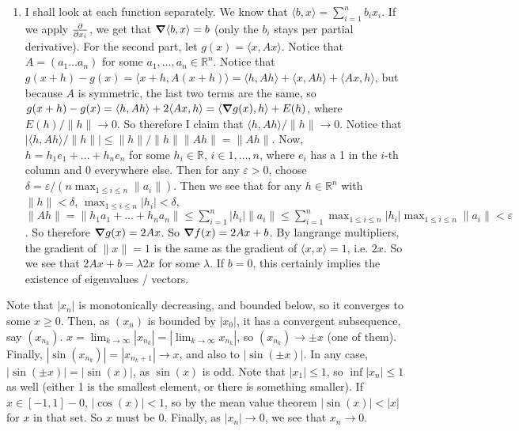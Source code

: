 \documentclass[12pt]{article}
\theoremstyle{definition}
\theoremstyle{remark}
\newcommand{\R}{\mathbb{R}}
\renewcommand{\ip}[2]{\langle #1, #2 \rangle}
\newcommand{\mg}[1]{\| #1 \|}
\newcommand{\ve}{\varepsilon}
\begin{document}
\begin{enumerate}[leftmargin=\labelsep]
		
		\item 
		I shall look at each function separately. We know that $\ip{b}{x} = \sum_{i=1}^{n} b_ix_i$. If we apply $\pdv{x_i}$, we get that $\grad{\ip{b}{x}} = b$ (only the $b_i$ stays per partial derivative). For the second part, let $g(x) = \ip{x}{Ax}$. Notice that $A = (a_1 \hdots a_n)$ for some $a_1, \hdots, a_n \in \R^n$. Notice that $g(x+h)-g(x)=\ip{x+h}{A(x+h)} = \ip{h}{Ah} + \ip{x}{Ah} + \ip{Ax}{h}$, but because $A$ is symmetric, the last two terms are the same, so $g(x+h)-g(x)=\ip{h}{Ah} + 2\ip{Ax}{h} = \ip{\grad{g(x)}}{h} + E(h)$, where $E(h)/\mg{h} \to 0$. So therefore I claim that $\ip{h}{Ah}/\mg{h} \to 0$. Notice that $|\ip{h}{Ah}/\mg{h}| \leq \mg{h}/\mg{h} \mg{Ah} = \mg{Ah}$. Now, $h = h_1e_1 + \hdots + h_ne_n$ for some $h_i \in \R$, $i\in 1, \hdots, n$, where $e_i$ has a 1 in the $i$-th column and 0 everywhere else. Then for any $\ve > 0$, choose $\delta = \ve/(n\max_{1 \leq i \leq n} \mg{a_i})$. Then we see that for any $h \in \R^n$ with $\mg{h} < \delta$, $\max_{1 \leq i \leq n} |h_i| < \delta$, $\mg{Ah} = \mg{h_1a_1 + \dots + h_na_n} \leq \sum_{i = 1}^{n} |h_i|\mg{a_i} \leq \sum_{i=1}^{n} \max_{ 1 \leq i \leq n} |h_i| \max_{1 \leq i \leq n} \mg{a_i} < \ve$. So therefore $\grad{g(x)} = 2Ax$. So $\grad{f}(x) = 2Ax+b$. By langrange multipliers, the gradient of $\mg{x} = 1$ is the same as the gradient of $\ip{x}{x} = 1$, i.e. $2x$. So we see that $2Ax + b = \lambda 2x$ for some $\lambda$. If $b = 0$, this certainly implies the existence of eigenvalues / vectors.
		
		\end{enumerate}
	
		\newpage
		Note that $|x_n|$ is monotonically decreasing, and bounded below, so it converges to some $x \geq 0$. Then, as $(x_n)$ is bounded by $|x_0|$, it has a convergent subsequence, say $(x_{n_k})$. $x = \lim_{k \to \infty} |x_{n_k}| = |\lim_{k \to \infty} x_{n_k}|$, so $(x_{n_k}) \to \pm x$ (one of them). Finally, $|\sin(x_{n_k})| = |x_{n_k+1}| \to x$, and also to $|\sin(\pm x)|$. In any case, $|\sin(\pm x)| = |\sin(x)|$, as $\sin(x)$ is odd. Note that $|x_1| \leq 1$, so $\inf |x_n| \leq 1$ as well (either 1 is the smallest element, or there is something smaller). If $x \in [-1, 1] - {0}$, $|\cos(x)| < 1$, so by the mean value theorem $|\sin(x)| < |x|$ for $x$ in that set. So $x$ must be 0. Finally, as $|x_n| \to 0$, we see that $x_n \to 0$.
\end{document}
